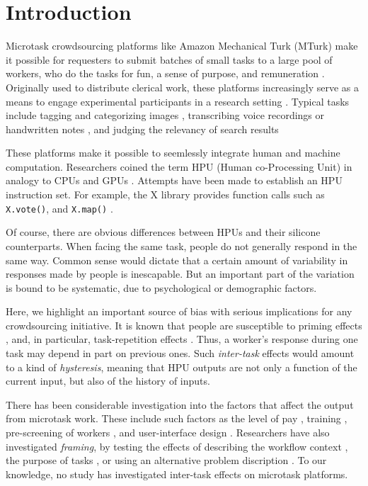 \documentclass[12pt]{article}
\begin{document}
\section*{Introduction}
Microtask crowdsourcing platforms like Amazon Mechanical Turk (MTurk) make it 
possible for requesters to submit batches of small tasks to a large pool of 
workers, who do the tasks for fun, a sense of purpose, and remuneration 
\cite{kazai2013analysis,Antin20122925}.  
Originally used to distribute clerical work, these platforms 
increasingly serve as a means to engage experimental 
participants in a research 
setting \cite{paolacci2010running,Berinsky2012351,snow2008cheap,alonso2009can}.
Typical tasks include tagging and categorizing images 
\cite{6116320,Zhai2012357}, transcribing voice recordings 
\cite{chandler2013breaking,paolacci2010running}
or handwritten notes \cite{Berinsky2012351,Finnerty2013}, and judging the 
relevancy of search results \cite{le2010ensuring,grady2010crowdsourcing,alonso2009can,kazai2013analysis}

These platforms make it possible to seemlessly integrate human and 
machine computation.  Researchers coined the term HPU 
(Human co-Processing Unit) in analogy to CPUs and GPUs \cite{5543192}.  
Attempts have been made to establish an HPU instruction set.  For example,
the X library provides function calls such as 
\texttt{X.vote()}, and \texttt{X.map()}
 \cite{little2010turkit,minder2011crowdlang,minder2012crowdlang,kittur2011crowdforge}.

Of course, there are obvious differences between HPUs and their silicone
counterparts.  When facing the same task, people do not generally
respond in the same way.  Common sense would dictate that a certain amount
of variability in responses made by people is inescapable.  But an important 
part of the variation is bound to be systematic, due to psychological or 
demographic factors.

Here, we highlight an important source of bias with
serious implications for any crowdsourcing initiative. 
It is known that people are susceptible to priming effects 
\cite{BJOP1796,No2007,beller1971priming}, and, in particular, task-repetition 
effects \cite{Gass1999549,sohn2001task}.  Thus, a worker's response during
one task may depend in part on previous ones.  Such \textit{inter-task} effects
would amount to a kind of \textit{hysteresis}, meaning that HPU outputs are not
only a function of the current input, but also of the history of inputs.  

There has been considerable investigation into the factors that affect the 
output from microtask work.  These include such factors as the 
level of 
pay \cite{kazai2013analysis}, training \cite{le2010ensuring}, pre-screening of 
workers \cite{paolacci2010running}, and user-interface design 
\cite{Finnerty2013}.  Researchers have also investigated \textit{framing}, 
by testing the effects of describing the workflow context 
\cite{Kinnaird2012281}, the purpose of tasks 
\cite{chandler2013breaking}, or using an alternative problem discription
\cite{thibodeau2013natural}.  To our knowledge, no study has investigated 
inter-task effects on microtask platforms.
\end{document}
